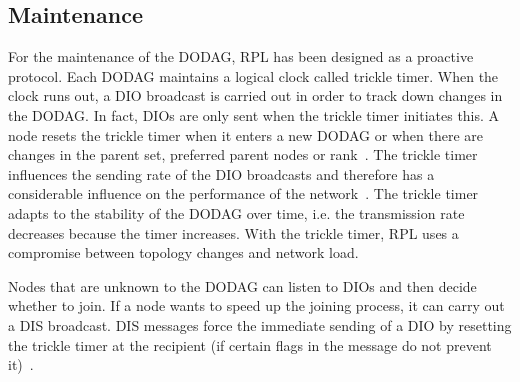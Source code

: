 \documentclass[english,version-2019-11]{uzl-thesis}
\begin{document}
\subsection{Maintenance}
For the maintenance of the DODAG, RPL has been designed
as a proactive protocol. Each DODAG maintains a logical clock
called trickle timer. When the clock runs out,
a DIO broadcast is carried out in order to track down changes
in the DODAG. In fact, DIOs are only sent
when the trickle timer initiates this.
A node resets the trickle timer when it enters
a new DODAG or when there are changes in the parent
set, preferred parent nodes or rank~\cite{rfc6550}.
The trickle timer influences the sending rate
of the DIO broadcasts and therefore has
a considerable influence on the performance
of the network~\cite{RPLMultiparent}. The trickle timer adapts to the
stability of the DODAG over time, i.e.
the transmission rate decreases because the timer increases.
With the trickle timer, RPL uses a
compromise between topology changes and network load.

Nodes that are unknown to the DODAG can listen to DIOs and
then decide whether to join. If a node wants to speed up the joining process,
it can carry out a DIS broadcast.
DIS messages force the immediate sending of a DIO by resetting
the trickle timer at the recipient (if certain flags
in the message do not prevent it)~\cite{rfc6550}.
\end{document}

